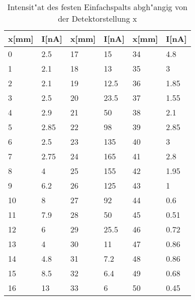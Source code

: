 \begin{table}[h]	
\centering
\begin{tabular}{|l l||l l||l l|} \hline
	x[mm] & I[nA] & x[mm] & I[nA] & x[mm] & I[nA]\\
	\hline
	0	&	2.5   &  17	&	15  & 34	&	4.8\\
	1	&	2.1   &  18	&	13  & 35	&	3\\
	2	&	2.1   &  19	&	12.5& 36	&	1.85\\
	3	&	2.5   &  20	&	23.5& 37	&	1.55\\
	4	&	2.9   &  21	&	50  & 38	&	2.1 \\
	5	&	2.85  &  22	&	98  & 39	&	2.85\\
	6	&	2.5   &  23	&	135 & 40	&	3\\
	7	&	2.75  &  24	&	165 & 41	&	2.8\\
	8	&	4     &  25	&	155 & 42	&	1.95\\
	9	&	6.2   &  26	&	125 & 43	&	1\\
	10	&	8     &  27	&	92  & 44	&	0.6\\
	11	&	7.9   &  28	&	50  & 45	&	0.51\\
	12	&	6     &  29	&	25.5& 46	&	0.72\\
	13	&	4     &  30	&	11  & 47	&	0.86\\
	14	&	4.8   &  31	&	7.2 & 48	&	0.86\\
	15	&	8.5   &  32	&	6.4 & 49	&	0.68\\
	16	&	13    &  33	&	6   & 50	&	0.45\\
	\hline
\end{tabular}
\caption{Intensit"at des festen Einfachspalts abgh"angig von der Detektorstellung x}
\label{tabelle_2}
\end{table}

